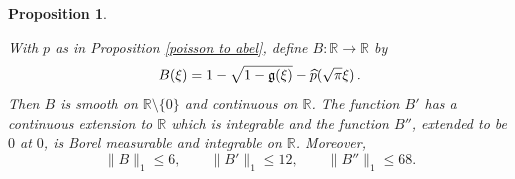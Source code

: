 \documentclass[12pt,reqno]{amsart}
\theoremstyle{plain}
\newtheorem{proposition}[theorem]{Proposition}
\numberwithin{equation}{section}
\theoremstyle{remark}
\newcommand{\uses}[1]{}
\newcommand{\usesdefs}[1]{}
\newcommand{\leanok}{}
\newcommand{\lean}[1]{}
\newcommand{\R}{{\mathbb R}}
\begin{document}
\begin{proposition}\label{auxiliary function B}\uses{square root one minus Gaussian,poisson to abel}\usesdefs{gaussian}
\lean{Auto.auxiliaryFunctionB_properties}
\leanok
    With $p$ as in Proposition \ref{poisson to abel}, define $B:\R\to \R$ by
\begin{equation}\label{auto:Gaussian-square-root-remainder}
    B(\xi)=1-\sqrt{1-\mathfrak{g}(\xi)}-\widehat{p}(\sqrt{\pi}\xi)\, .
\end{equation}
Then $B$ is smooth on $\R\setminus \{0\}$ and continuous on $\R$. The function $B'$
has a continuous extension to $\R$ which is integrable and the
function $B''$, extended to be $0$ at $0$, is Borel measurable and integrable on $\R$.
Moreover,
\begin{equation}\label{eq:B-explicit-norms}
    \|B\|_1\le 6,\qquad
    \|B'\|_1\le 12,\qquad
    \|B''\|_1\le 68.
\end{equation}
\end{proposition}
\end{document}
